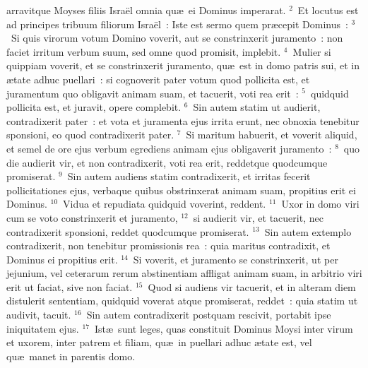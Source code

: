 \bchapter
{}arravitque Moyses filiis Isra\"el omnia qu\ae\ ei Dominus imperarat.
${}^{2}$~Et locutus est ad principes tribuum filiorum Isra\"el~: Iste est sermo quem pr\ae cepit Dominus~:
${}^{3}$~Si quis virorum votum Domino voverit, aut se constrinxerit juramento~: non faciet irritum verbum suum, sed omne quod promisit, implebit.
${}^{4}$~Mulier si quippiam voverit, et se constrinxerit juramento, qu\ae\ est in domo patris sui, et in \ae tate adhuc puellari~: si cognoverit pater votum quod pollicita est, et juramentum quo obligavit animam suam, et tacuerit, voti rea erit~:
${}^{5}$~quidquid pollicita est, et juravit, opere complebit.
${}^{6}$~Sin autem statim ut audierit, contradixerit pater~: et vota et juramenta ejus irrita erunt, nec obnoxia tenebitur sponsioni, eo quod contradixerit pater.
${}^{7}$~Si maritum habuerit, et voverit aliquid, et semel de ore ejus verbum egrediens animam ejus obligaverit juramento~:
${}^{8}$~quo die audierit vir, et non contradixerit, voti rea erit, reddetque quodcumque promiserat.
${}^{9}$~Sin autem audiens statim contradixerit, et irritas fecerit pollicitationes ejus, verbaque quibus obstrinxerat animam suam, propitius erit ei Dominus.
${}^{10}$~Vidua et repudiata quidquid voverint, reddent.
${}^{11}$~Uxor in domo viri cum se voto constrinxerit et juramento,
${}^{12}$~si audierit vir, et tacuerit, nec contradixerit sponsioni, reddet quodcumque promiserat.
${}^{13}$~Sin autem extemplo contradixerit, non tenebitur promissionis rea~: quia maritus contradixit, et Dominus ei propitius erit.
${}^{14}$~Si voverit, et juramento se constrinxerit, ut per jejunium, vel ceterarum rerum abstinentiam affligat animam suam, in arbitrio viri erit ut faciat, sive non faciat.
${}^{15}$~Quod si audiens vir tacuerit, et in alteram diem distulerit sententiam, quidquid voverat atque promiserat, reddet~: quia statim ut audivit, tacuit.
${}^{16}$~Sin autem contradixerit postquam rescivit, portabit ipse iniquitatem ejus.
${}^{17}$~Ist\ae\ sunt leges, quas constituit Dominus Moysi inter virum et uxorem, inter patrem et filiam, qu\ae\ in puellari adhuc \ae tate est, vel qu\ae\ manet in parentis domo.


